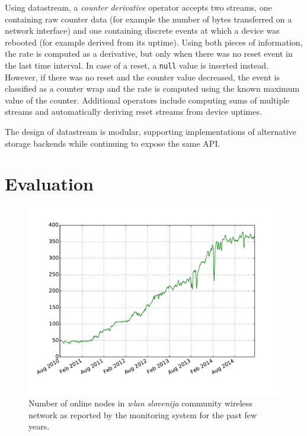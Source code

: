 \documentclass[5p,sort&compress]{elsarticle}
\newcommand{\wlanslovenija}{\textit{wlan slovenija}}
\begin{document}
Using datastream, a \textit{counter derivative} operator accepts two streams, one containing raw counter data (for example the number of bytes transferred on a network interface) and one containing discrete events at which a device was rebooted (for example derived from its uptime).
Using both pieces of information, the rate is computed as a derivative, but only when there was no reset event in the last time interval.
In case of a reset, a \texttt{null} value is inserted instead.
However, if there was no reset and the counter value decreased, the event is classified as a counter wrap and the rate is computed using the known maximum value of the counter.
Additional operators include computing sums of multiple streams and automatically deriving reset streams from device uptimes.

The design of datastream is modular, supporting implementations of alternative storage backends while continuing to expose the same API.

\section{Evaluation}
\label{sec:evaluation}

\begin{figure}
  \centering
  \includegraphics[scale=0.45]{figures/wlansi-nodes-up.pdf}
  \caption{Number of online nodes in \wlanslovenija{} community wireless network as reported by the monitoring system for the past few years.}
  \label{fig:wlansi-nodes-up}
\end{figure}

\end{document}
